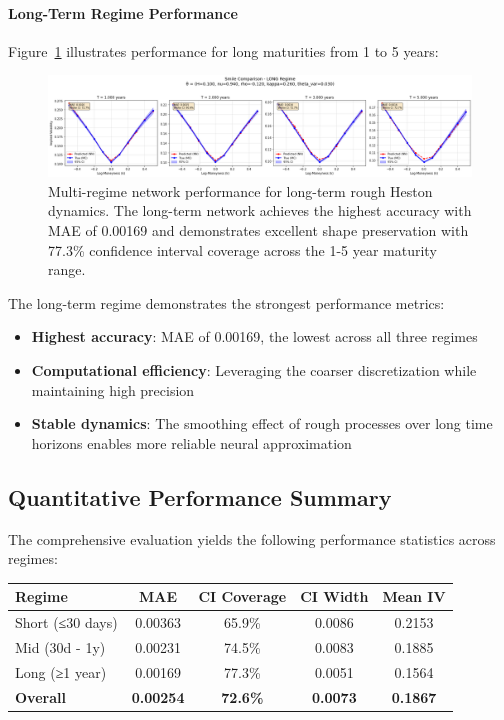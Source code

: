 	\paragraph{Long-Term Regime Performance}
	
	Figure~\ref{fig:multiregime-long} illustrates performance for long maturities from 1 to 5 years:
	
	\begin{figure}[ht]
		\centering
		\includegraphics[width=\textwidth]{../images/smile_comparison_long_regime.png}
		\caption{Multi-regime network performance for long-term rough Heston dynamics. The long-term network achieves the highest accuracy with MAE of 0.00169 and demonstrates excellent shape preservation with 77.3\% confidence interval coverage across the 1-5 year maturity range.}
		\label{fig:multiregime-long}
	\end{figure}
	
	The long-term regime demonstrates the strongest performance metrics:
	
	\begin{itemize}[nosep]
		\item \textbf{Highest accuracy}: MAE of 0.00169, the lowest across all three regimes
		\item \textbf{Computational efficiency}: Leveraging the coarser discretization while maintaining high precision
		\item \textbf{Stable dynamics}: The smoothing effect of rough processes over long time horizons enables more reliable neural approximation
	\end{itemize}
	
	\subsection{Quantitative Performance Summary}
	
	The comprehensive evaluation yields the following performance statistics across regimes:
	
	\begin{center}
		\begin{tabular}{@{}lcccc@{}}
			\toprule
			\textbf{Regime} & \textbf{MAE} & \textbf{CI Coverage} & \textbf{CI Width} & \textbf{Mean IV} \\
			\midrule
			Short (≤30 days) & 0.00363 & 65.9\% & 0.0086 & 0.2153 \\
			Mid (30d - 1y) & 0.00231 & 74.5\% & 0.0083 & 0.1885 \\
			Long (≥1 year) & 0.00169 & 77.3\% & 0.0051 & 0.1564 \\
			\midrule
			\textbf{Overall} & \textbf{0.00254} & \textbf{72.6\%} & \textbf{0.0073} & \textbf{0.1867} \\
			\bottomrule
		\end{tabular}
	\end{center}
	
